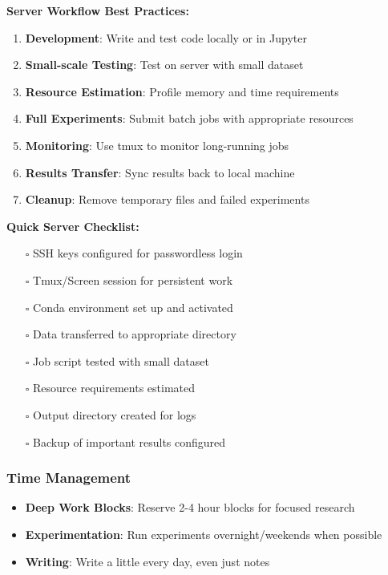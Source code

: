 \documentclass[11pt,a4paper]{article}
\begin{document}
\textbf{Server Workflow Best Practices:}

\begin{tcolorbox}[colback=green!5,colframe=green!50,title={Recommended Workflow}]
\begin{enumerate}
    \item \textbf{Development}: Write and test code locally or in Jupyter
    \item \textbf{Small-scale Testing}: Test on server with small dataset
    \item \textbf{Resource Estimation}: Profile memory and time requirements
    \item \textbf{Full Experiments}: Submit batch jobs with appropriate resources
    \item \textbf{Monitoring}: Use tmux to monitor long-running jobs
    \item \textbf{Results Transfer}: Sync results back to local machine
    \item \textbf{Cleanup}: Remove temporary files and failed experiments
\end{enumerate}
\end{tcolorbox}

\textbf{Quick Server Checklist:}

\begin{itemize}
    \item[$\square$] SSH keys configured for passwordless login
    \item[$\square$] Tmux/Screen session for persistent work
    \item[$\square$] Conda environment set up and activated
    \item[$\square$] Data transferred to appropriate directory
    \item[$\square$] Job script tested with small dataset
    \item[$\square$] Resource requirements estimated
    \item[$\square$] Output directory created for logs
    \item[$\square$] Backup of important results configured
\end{itemize}

\subsubsection{Time Management}
\begin{itemize}
    \item \textbf{Deep Work Blocks}: Reserve 2-4 hour blocks for focused research
    \item \textbf{Experimentation}: Run experiments overnight/weekends when possible
    \item \textbf{Writing}: Write a little every day, even just notes
\end{itemize}
\end{document}
